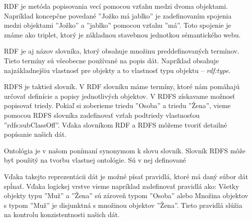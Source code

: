\documentclass[12pt, a4paper, oneside]{book}
\begin{document}
RDF je metóda popisovania vecí pomocou vzťahu medzi dvoma objektami. Napríklad koncepčne povedané ''Jožko má jablko'' je zadefinovaním spojenia medzi objektami ''Jožko'' a ''jablko'' pomocou vzťahu ''má''.
Toto spojenie je známe ako triplet, ktorý je základnou stavebnou jednotkou sémantického webu. 


RDF je aj názov slovníka, ktorý obsahuje množinu preddefinovaných termínov. Tieto termíny sú všeobecne používané na popis dát. Napríklad obsahuje najzákladnejšiu vlastnosť pre objekty a to vlastnosť typu objektu -- \textit{rdf:type}. 


RDFS je taktiež slovník. V RDF slovníku máme termíny, ktoré nám pomáhajú určovať definície a popisy jednotlivých objektov. V RDFS získavame možnosť popisovať triedy. Pokiaľ si zoberieme triedu ''Osoba'' a triedu ''Žena'', vieme pomocou RDFS slovníka zadefinovať vzťah podtriedy vlastnosťou ''rdfs:subClassOff''. Vďaka slovníkom RDF a RDFS môžeme tvoriť detailné popísanie našich dát.


Ontológia je v našom ponímaní synonymom k slovu slovník. Slovník RDFS môže byť použitý na tvorbu vlastnej ontológie. Sú v nej definované 


Vďaka takejto reprezentácii dát je možné písať pravidlá, ktoré má daný súbor dát spĺnať. Vďaka logickej vrstve vieme napríklad zadefinovať pravidlá ako: Všetky objekty typu ''Muž'' a ''Žena'' sú zároveň typom ''Osoba'' alebo Množina objektov s typom ''Muž'' je disjunktná s množinou objektov ''Žena''. Tieto pravidlá slúžia na kontrolu konzistentnosti našich dát.


\end{document}
